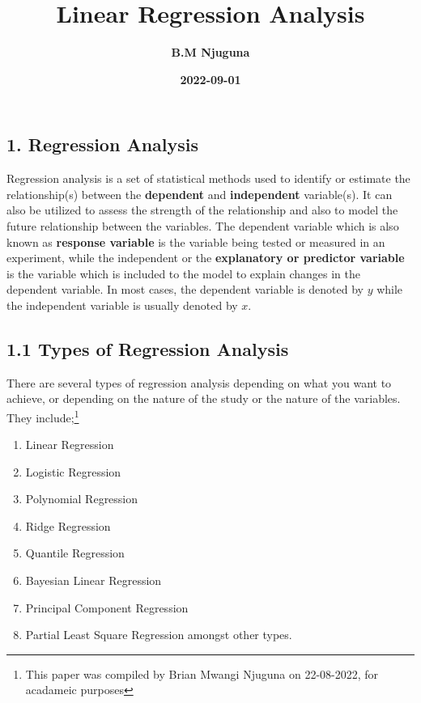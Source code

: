\documentclass[
]{article}
\title{\textbf{Linear Regression Analysis}}
\author{\textbf{B.M Njuguna}}
\date{\textbf{2022-09-01}}
\begin{document}
\maketitle

\newpage
\tableofcontents
\newpage

\hypertarget{regression-analysis}{%
\subsection{1. Regression Analysis}\label{regression-analysis}}

Regression analysis is a set of statistical methods used to identify or
estimate the relationship(s) between the \textbf{dependent} and
\textbf{independent} variable(s). It can also be utilized to assess the
strength of the relationship and also to model the future relationship
between the variables. The dependent variable which is also known as
\textbf{response variable} is the variable being tested or measured in
an experiment, while the independent or the \textbf{explanatory or
predictor variable} is the variable which is included to the model to
explain changes in the dependent variable. In most cases, the dependent
variable is denoted by \(y\) while the independent variable is usually
denoted by \(x\).

\hypertarget{types-of-regression-analysis}{%
\subsection{1.1 Types of Regression
Analysis}\label{types-of-regression-analysis}}

There are several types of regression analysis depending on what you
want to achieve, or depending on the nature of the study or the nature
of the variables. They include;\footnote{ This paper was compiled by
  Brian Mwangi Njuguna on 22-08-2022, for acadameic purposes}

\begin{enumerate}
\def\labelenumi{\arabic{enumi}.}
\item
  Linear Regression
\item
  Logistic Regression
\item
  Polynomial Regression
\item
  Ridge Regression
\item
  Quantile Regression
\item
  Bayesian Linear Regression
\item
  Principal Component Regression
\item
  Partial Least Square Regression amongst other types.
\end{enumerate}
\end{document}
